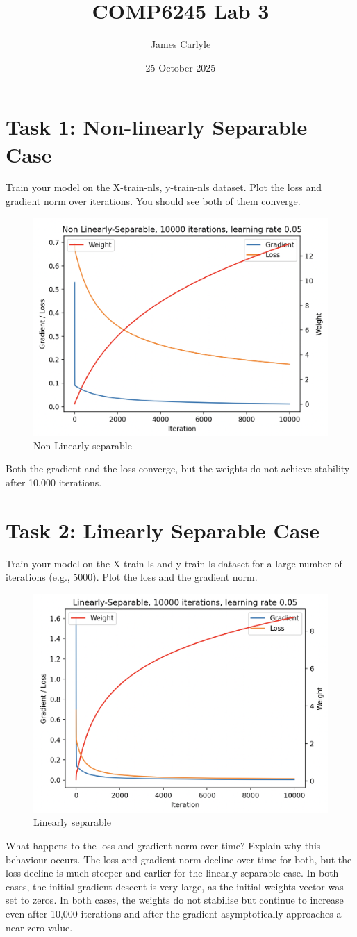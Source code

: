\documentclass[11pt]{article}
\title{COMP6245 Lab 3}
\author{James Carlyle}
\date{25 October 2025}
\begin{document}
\maketitle
\section{Task 1: Non-linearly Separable Case}
Train your model on the X-train-nls, y-train-nls dataset. Plot the loss and gradient norm over iterations. You should see both of them converge.
\begin{figure}[h]
    \centering
    \includegraphics[width=0.5\linewidth]{1.png}
    \caption{Non Linearly separable}
    \label{fig 1}
\end{figure}

Both the gradient and the loss converge, but the weights do not achieve stability after 10,000 iterations.

\section{Task 2: Linearly Separable Case}
Train your model on the X-train-ls and y-train-ls dataset for a large number of iterations (e.g., 5000). Plot the loss and the gradient norm.
\begin{figure}[h]
    \centering
    \includegraphics[width=0.5\linewidth]{2.png}
    \caption{Linearly separable}
    \label{fig 2}
\end{figure}

What happens to the loss and gradient norm over time? Explain why this behaviour occurs.
The loss and gradient norm decline over time for both, but the loss decline is much steeper and earlier for the linearly separable case. In both cases, the initial gradient descent is very large, as the initial weights vector was set to zeros. In both cases, the weights do not stabilise but continue to increase even after 10,000 iterations and after the gradient asymptotically approaches a near-zero value.
\end{document}
